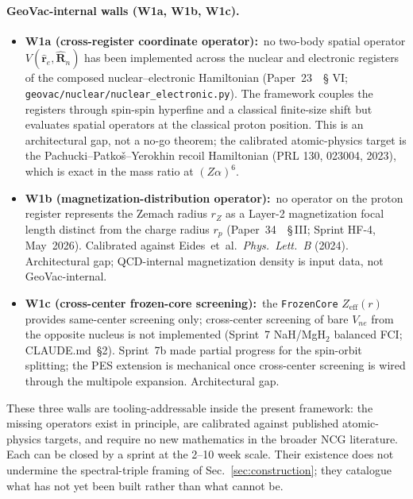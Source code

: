 \documentclass[11pt]{article}
\begin{document}
\paragraph{GeoVac-internal walls (W1a, W1b, W1c).}

\begin{itemize}\setlength{\itemsep}{2pt}
\item \textbf{W1a (cross-register coordinate operator):}\ no two-body
spatial operator $V(\hat{\mathbf{r}}_e, \hat{\mathbf{R}}_n)$ has been
implemented across the nuclear and electronic registers of the
composed nuclear--electronic Hamiltonian (Paper~23~\cite{paper23}~\S
VI; \texttt{geovac/nuclear/nuclear\_electronic.py}).  The framework
couples the registers through spin-spin hyperfine and a classical
finite-size shift but evaluates spatial operators at the classical
proton position.  This is an architectural gap, not a no-go theorem;
the calibrated atomic-physics target is the
Pachucki--Patko\v{s}--Yerokhin recoil Hamiltonian (PRL 130, 023004,
2023), which is exact in the mass ratio at $(Z\alpha)^6$.
\item \textbf{W1b (magnetization-distribution operator):}\ no
operator on the proton register represents the Zemach radius
$r_Z$ as a Layer-2 magnetization focal length distinct from the
charge radius $r_p$ (Paper~34~\cite{paper34}~\S\,III; Sprint HF-4,
May~2026).  Calibrated against Eides~et~al.\ \emph{Phys.\ Lett.\ B}
(2024).  Architectural gap; QCD-internal magnetization density is
input data, not GeoVac-internal.
\item \textbf{W1c (cross-center frozen-core screening):}\ the
\texttt{FrozenCore} $Z_{\mathrm{eff}}(r)$ provides same-center
screening only; cross-center screening of bare $V_{ne}$ from the
opposite nucleus is not implemented (Sprint~7 NaH/MgH$_2$ balanced
FCI; CLAUDE.md~\S2).  Sprint~7b made partial progress for the
spin-orbit splitting; the PES extension is mechanical once cross-center
screening is wired through the multipole expansion.  Architectural
gap.
\end{itemize}

These three walls are tooling-addressable inside the present
framework: the missing operators exist in principle, are calibrated
against published atomic-physics targets, and require no new
mathematics in the broader NCG literature.  Each can be closed by a
sprint at the 2--10 week scale.  Their existence does not undermine
the spectral-triple framing of Sec.~\ref{sec:construction}; they
catalogue what has not yet been built rather than what cannot be.
\end{document}
